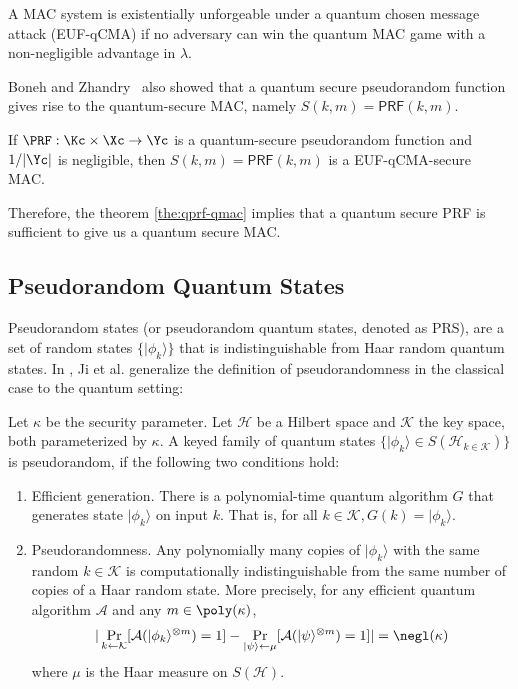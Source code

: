 \begin{definition}
	A MAC system is existentially unforgeable under a quantum chosen message attack (EUF-qCMA) if no adversary can win the quantum MAC game with a non-negligible advantage in $\lambda$.
\end{definition}

Boneh and Zhandry~\cite{EC:BonZha13} also showed that a quantum secure pseudorandom function gives rise to the quantum-secure MAC, namely $S(k,m)=\mathsf{PRF}(k,m)$.
\begin{theorem}\label{the:qprf-qmac}
	If $\PRF:\Kc \times \Xc \to \Yc$ is a quantum-secure pseudorandom function and $1/|\Yc|$ is negligible, then $S(k,m)=\mathsf{PRF}(k,m)$ is a EUF-qCMA-secure MAC.
\end{theorem}

Therefore, the theorem \ref{the:qprf-qmac} implies that a quantum secure PRF is sufficient to give us a quantum secure MAC.

\subsection{Pseudorandom Quantum States}
Pseudorandom states (or pseudorandom quantum states, denoted as PRS), are a set of random states $\{|\phi_k\rangle\}$ that is indistinguishable from Haar random quantum states. In \cite{C:JiLiuSon18}, Ji et al. generalize the definition of pseudorandomness in the classical case to the quantum setting:

\begin{definition}
Let $\kappa$ be the security parameter. Let $\mathcal{H}$ be a Hilbert space and $\mathcal{K}$ the key space, both parameterized by $\kappa$. A keyed family of quantum states $\{|\phi_k\rangle \in S(\mathcal{H}_{k\in\mathcal{K}})\}$ is pseudorandom, if the following two conditions hold:
\begin{enumerate}
	\item Efficient generation. There is a polynomial-time quantum algorithm $G$ that generates state $|\phi_k\rangle$ on input $k$. That is, for all $k\in\mathcal{K},G(k)=|\phi_k\rangle$.
	\item Pseudorandomness. Any polynomially many copies of $|\phi_k\rangle$ with the same random $k\in\mathcal{K}$ is computationally indistinguishable from the same number of copies of a Haar random state. More precisely, for any efficient quantum algorithm $\mathcal{A}$ and any $m\in\poly(\kappa)$,
	$$
	|\Pr_{k\gets\mathcal{K}}[\mathcal{A}(|\phi_k\rangle^{\otimes m})=1] - \Pr_{|\psi\rangle\gets\mu}[\mathcal{A}(|\psi\rangle^{\otimes m})=1]  |=\negl(\kappa)
	$$
	where $\mu$ is the Haar measure on $S(\mathcal{H})$.
\end{enumerate}

\end{definition}

